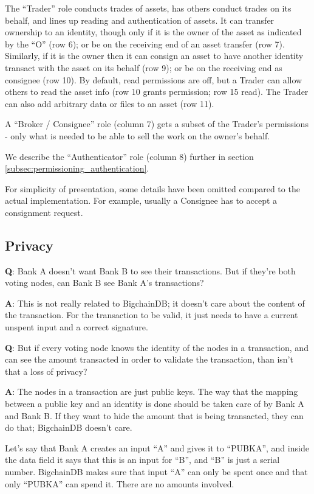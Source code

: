 The “Trader” role conducts trades of assets, has others conduct trades on its behalf, and lines up reading and authentication of assets.
It can transfer ownership to an identity, though only if it is the owner of the asset as indicated by the “O” (row 6); or be on the receiving end of an asset transfer (row 7).
Similarly, if it is the owner then it can consign an asset to have another identity transact with the asset on its behalf (row 9); or be on the receiving end as consignee (row 10). By default, read permissions are off, but a Trader can allow others to read the asset info (row 10 grants permission; row 15 read). The Trader can also add arbitrary data or files to an asset (row 11).

A “Broker / Consignee” role (column 7) gets a subset of the Trader’s permissions - only what is needed to be able to sell the work on the owner’s behalf.

We describe the “Authenticator” role (column 8) further in section \ref{subsec:permissioning_authentication}.

For simplicity of presentation, some details have been omitted compared to the actual implementation.
For example, usually a Consignee has to accept a consignment request.

\subsection{Privacy}

\noindent \textbf{Q}: Bank A doesn’t want Bank B to see their transactions.
But if they’re both voting nodes, can Bank B see Bank A’s transactions?

\noindent \textbf{A}: This is not really related to BigchainDB; it doesn’t care about the content of the transaction.
For the transaction to be valid, it just needs to have a current unspent input and a correct signature.

\medskip
\noindent \textbf{Q}: But if every voting node knows the identity of the nodes in a transaction, and can see the amount transacted in order to validate the transaction, than isn’t that a loss of privacy?

\noindent \textbf{A}: The nodes in a transaction are just public keys.
The way that the mapping between a public key and an identity is done should be taken care of by Bank A and Bank B.
If they want to hide the amount that is being transacted, they can do that; BigchainDB doesn't care.

Let’s say that Bank A creates an input “A” and gives it to “PUBKA”, and inside the data field it says that this is an input for “B”, and “B” is just a serial number.
BigchainDB makes sure that input “A” can only be spent once and that only “PUBKA” can spend it.
There are no amounts involved.

